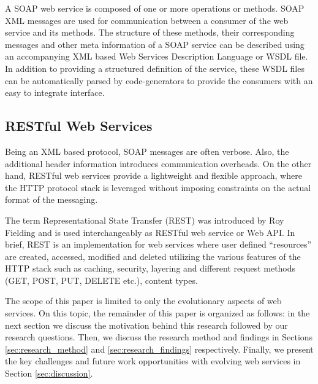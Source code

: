 \documentclass[runningheads,a4paper]{llncs}
\begin{document}
A SOAP web service is composed of one or more operations or methods. SOAP XML messages are used for communication between a consumer of the web service and its methods. The structure of these methods, their corresponding messages and other meta information of a SOAP service can be described using an accompanying XML based Web Services Description Language or WSDL file. In addition to providing a structured definition of the service, these WSDL files can be automatically parsed by code-generators to provide the consumers with an easy to integrate interface.


\subsection{RESTful Web Services} %
\label{sub:restful_web_services}
Being an XML based protocol, SOAP messages are often verbose. Also, the additional header information introduces communication overheads. On the other hand, RESTful web services provide a lightweight and flexible approach, where the HTTP protocol stack is leveraged without imposing constraints on the actual format of the messaging.

The term Representational State Transfer (REST) was introduced by Roy Fielding \cite{rest_wiki} and is used interchangeably as RESTful web service or Web API. In brief, REST is an implementation for web services where user defined ``resources'' are created, accessed, modified and deleted utilizing the various features of the HTTP stack such as caching, security, layering and different request methods (GET, POST, PUT, DELETE etc.), content types.


The scope of this paper is limited to only the evolutionary aspects of web services. On this topic, the remainder of this paper is organized as follows: in the next section we discuss the motivation behind this research followed by our research questions. Then, we discuss the research method and findings in Sections \ref{sec:research_method} and \ref{sec:research_findings} respectively. Finally, we present the key challenges and future work opportunities with evolving web services in Section \ref{sec:discussion}.
\end{document}
